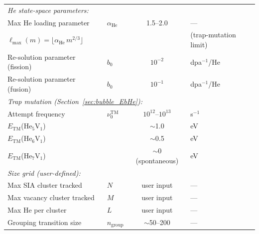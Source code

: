 \begin{table}[htbp]
\begin{tabular}{@{}llcl@{}}
\multicolumn{4}{l}{\emph{He state-space parameters:}} \\
Max He loading parameter & $\alpha_{\mathrm{He}}$ & 1.5--2.0 & --- \\
$\ell_{\max}(m) = \lfloor\alpha_{\mathrm{He}}\,m^{2/3}\rfloor$
  & & & (trap-mutation limit) \\
Re-solution parameter (fission) & $b_0$ & $10^{-2}$ & dpa$^{-1}$/He \\
Re-solution parameter (fusion) & $b_0$ & $10^{-1}$ & dpa$^{-1}$/He \\[4pt]

\multicolumn{4}{l}{\emph{Trap mutation (Section~\ref{sec:bubble_EbHe}):}} \\
Attempt frequency & $\nu_0^{\mathrm{TM}}$ & $10^{12}$--$10^{13}$ & s$^{-1}$ \\
$E_{\mathrm{TM}}$(He$_5$V$_1$) & & $\sim$1.0 & eV \\
$E_{\mathrm{TM}}$(He$_6$V$_1$) & & $\sim$0.5 & eV \\
$E_{\mathrm{TM}}$(He$_7$V$_1$) & & $\sim$0 (spontaneous) & eV \\[4pt]

\multicolumn{4}{l}{\emph{Size grid (user-defined):}} \\
Max SIA cluster tracked & $N$ & user input & --- \\
Max vacancy cluster tracked & $M$ & user input & --- \\
Max He per cluster & $L$ & user input & --- \\
Grouping transition size & $n_{\mathrm{group}}$ & $\sim$50--200 & --- \\
\bottomrule
\end{tabular}
\end{table}

